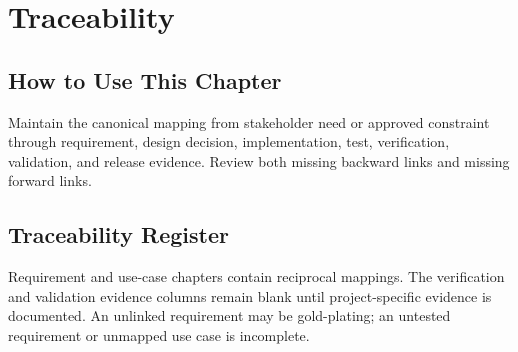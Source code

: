 \chapter{Traceability}
\section{How to Use This Chapter}
Maintain the canonical mapping from stakeholder need or approved constraint through requirement, design decision, implementation, test, verification, validation, and release evidence. Review both missing backward links and missing forward links.
\section{Traceability Register}
Requirement and use-case chapters contain reciprocal mappings. The verification and validation evidence columns remain blank until project-specific evidence is documented. An
unlinked requirement may be gold-plating; an untested requirement or unmapped
use case is incomplete.

